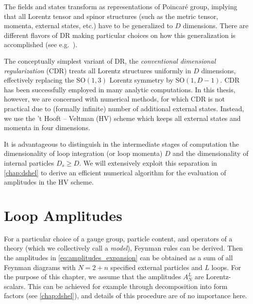 The fields and states transform as representations of Poincaré group,
implying that all Lorentz tensor and spinor structures (such as the metric tensor, momenta, external states, etc.\@) have
to be generalized to $D$ dimensions.
There are different flavors of DR making particular choices on how this generalization is accomplished (see e.g.\ \cite{Gnendiger:2017pys}).

The conceptually simplest variant of DR, the \emph{conventional dimensional regularization} (CDR)
treats all Lorentz structures uniformly in $D$ dimensions, effectively replacing the $\mathrm{SO}(1,3)$ Lorentz symmetry by $\mathrm{SO}(1,D-1)$.
CDR has been successfully employed in many analytic computations.
In this thesis, however, we are concerned with numerical methods, for which CDR is not practical due to
(formally infinite) number of additional external states.
Instead, we use the 't Hooft -- Veltman (HV) scheme which keeps all external states and momenta in four dimensions.

It is advantageous to distinguish in the intermediate stages of computation the dimensionality of loop integration (or loop momenta) $D$ and
the dimensionality of internal particles $D_s \geq  D$.
We will extensively exploit this separation in \cref{chap:dshel} to derive an efficient numerical algorithm
for the evaluation of amplitudes in the HV scheme.


\section{Loop Amplitudes}

For a particular choice of a gauge group, particle content, and operators of
a theory (which we collectively call a \emph{model}), Feynman rules can be derived.
Then the amplitudes in \cref{eq:amplitudes_expansion} can be obtained as a sum of all Feynman diagrams
with $N = 2+n$ specified external particles and $L$ loops.
For the purpose of this chapter, we assume that the amplitudes $A^{L}_N$ are Lorentz-scalars.
This can be achieved for example through decomposition into form factors (see \cref{chap:dshel}),
and details of this procedure are of no importance here.

